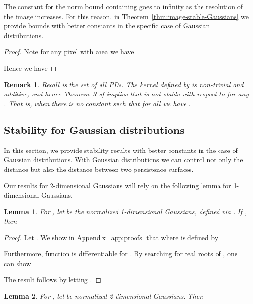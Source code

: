 \documentclass[11pt]{article}
\newtheorem{lemma}{Lemma}
\newtheorem{rem}{Remark}
\begin{document}
The constant for the  norm bound containing  goes to infinity as the resolution of the image increases. For this reason, in Theorem~\ref{thm:image-stable-Gaussians} we provide bounds with better constants in the specific case of Gaussian distributions.

\begin{proof}
Note for any pixel  with area  we have 

Hence we have

\end{proof}

\begin{rem}\label{rem:only-1-stable}
Recall  is the set of all PDs. The kernel  defined by  is non-trivial and additive, and hence Theorem~3 of \citet{reininghaus2015stable} implies that  is not stable with respect to  for any . That is, when  there is no constant  such that for all  we have .
\end{rem}

\subsection{Stability for Gaussian distributions}\label{subsec:stability_Gaussian}

In this section, we provide stability results with better constants in the case of Gaussian distributions. With Gaussian distributions we can control not only the  distance but also the  distance between two persistence surfaces.

Our results for 2-dimensional Gaussians will rely on the following lemma for 1-dimensional Gaussians. 

\begin{lemma}\label{lem:l1surfbound_1D}
For , let  be the normalized 1-dimensional Gaussians, defined via . If , then 
\end{lemma}

\begin{proof} Let . We show in Appendix~\ref{app:proofs} that 
where  is defined by

Furthermore, function  is differentiable for . By searching for real roots of , one can show


The result follows by letting .
\end{proof}

\begin{lemma}\label{lem:l1surfbound_2D}
For , let  be normalized 2-dimensional Gaussians. Then

\end{lemma}
\end{document}
